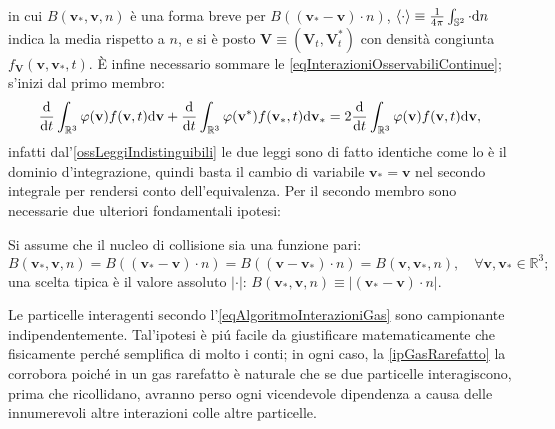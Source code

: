         in cui \(B(\mathbf v_*,\mathbf v,n)\) è una forma breve per \(B((\mathbf v_*-\mathbf v)\cdot n)\), 
        \(
          \langle\cdot\rangle\equiv
          \frac1{4\pi}\int_{\mathbb S^2}
          \cdot\mathrm{d} n
        \) 
        indica la media rispetto a \(n\), e si è posto \(\mathbf V\equiv(\mathbf V_t,\mathbf V^*_t)\) con densità congiunta \(f_{\mathbf V}(\mathbf v,\mathbf v_*,t)\). È infine necessario sommare le \eqref{eqInterazioniOsservabiliContinue}; s'inizi dal primo membro:
        \begin{equation}
          \label{eqSommaPrimoMembroIOC}
          \frac{\mathrm{d}}{\mathrm{d}t}\int_{\mathbb R^3}\varphi(\mathbf v)f(\mathbf v,t)\mathrm{d}\mathbf v+
          \frac{\mathrm{d}}{\mathrm{d}t}\int_{\mathbb R^3}\varphi(\mathbf v^*)f(\mathbf v_*,t)\mathrm{d}\mathbf v_*
          =2\frac{\mathrm{d}}{\mathrm{d}t}\int_{\mathbb R^3}\varphi(\mathbf v)f(\mathbf v,t)\mathrm{d}\mathbf v,
        \end{equation}
        infatti dal'\cref{ossLeggiIndistinguibili} le due leggi sono di fatto identiche come lo è il dominio d'integrazione, quindi basta il cambio di variabile \(\mathbf v_*=\mathbf v\) nel secondo integrale per rendersi conto dell'equivalenza. Per il secondo membro sono necessarie due ulteriori fondamentali ipotesi:

        \begin{ipo}
          \label{ipParitàTassoInterazioneGas}
          Si assume che il nucleo di collisione sia una funzione pari:
          \begin{equation}
            \label{eqParitàNucleoCollisioneGas}
            B(\mathbf v_*,\mathbf v,n)=B((\mathbf v_*-\mathbf v)\cdot n)=
            B((\mathbf v-\mathbf v_*)\cdot n)=B(\mathbf v,\mathbf v_*,n),
            \quad\forall\mathbf v,\mathbf v_*\in\mathbb R^3;
          \end{equation}
          una scelta tipica è il valore assoluto \(\vert\cdot\vert\): \(B(\mathbf v_*,\mathbf v,n)\equiv\vert(\mathbf v_*-\mathbf v)\cdot n\vert\).
        \end{ipo}

        \begin{ipo}
          \label{ipCaoMolecolare}
          Le particelle interagenti secondo l'\ref{eqAlgoritmoInterazioniGas} sono campionante indipendentemente. Tal'ipotesi è piú facile da giustificare matematicamente che fisicamente perché semplifica di molto i conti; in ogni caso, la \ref{ipGasRarefatto} la corrobora poiché in un gas rarefatto è naturale che se due particelle interagiscono, prima che ricollidano, avranno perso ogni vicendevole dipendenza a causa delle innumerevoli altre interazioni colle altre particelle.
        \end{ipo}

